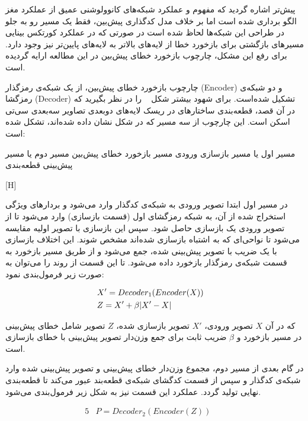 پیش‌تر اشاره گردید که مفهوم و عملکرد شبکه‌های کانوولوشنی عمیق از عملکرد مغز الگو برداری شده است اما بر خلاف مدل‌ کدگذاری پیش‌بین، فقط یک مسیر رو به جلو در طراحی این شبکه‌ها لحاظ شده است در صورتی که در عملکرد کورتکس بینایی مسیرهای بازگشتی برای بازخورد خطا از لایه‌های بالاتر به لایه‌های پایین‌تر نیز وجود دارد. برای رفع این مشکل، چارچوب بازخورد خطای پیش‌بین در این مطالعه ارایه گردیده است.


چارچوب بازخورد خطای پیش‌بین، از یک شبکه‌ی رمزگذار (Encoder) و دو شبکه‌ی رمزگشا (Decoder) تشکیل شده‌است. برای شهود بیشتر شکل ~ را در نظر بگیرید که در آن قصد، قطعه‌بندی ساختارهای در ریسک لایه‌های دوبعدی تصاویر سه‌بعدی سی‌تی اسکن است. این چارچوب از سه مسیر که در شکل نشان داده شده‌اند، تشکل شده است:

 مسیر اول یا مسیر بازسازی ورودی
 مسیر بازخورد خطای پیش‌بین
 مسیر دوم یا مسیر پیش‌بینی قطعه‌بندی

[H]

در مسیر اول ابتدا تصویر ورودی به شبکه‌ی کدگذار وارد می‌شود و بردارهای ویژگی استخراج شده از آن، به شبکه رمزگشای اول (قسمت بازسازی) وارد می‌شود تا از تصویر ورودی یک بازسازی حاصل شود. سپس این بازسازی با تصویر اولیه مقایسه‌ می‌شود تا نواحی‌ای که به اشتباه بازسازی شده‌اند مشخص شوند. این اختلاف بازسازی با یک ضریب با تصویر پیش‌بینی شده، جمع می‌شود و از طریق مسیر بازخورد به قسمت شبکه‌ی رمزگذار بازخورد داده می‌شود. تا این قسمت از روند را می‌توان به صورت زیر فرمول‌بندی نمود:

\begin{alignat}{5}
	&X' = Decoder_1(Encoder(X))    \label{recpep} && \\
	&Z = X' + \beta|X'-X| && \notag
\end{alignat}

که در آن $X$ تصویر ورودی، $X'$ تصویر بازسازی شده، $Z$ تصویر شامل‌ خطای پیش‌بینی در مسیر بازخورد و $\beta$ ضریب ثابت برای جمع وزن‌دار تصویر پیش‌بینی با خطای بازسازی است.

در گام بعدی از مسیر دوم، مجموع وزن‌دار خطای پیش‌بینی و تصویر پیش‌بینی شده وارد شبکه‌ی کدگذار و سپس از قسمت کدگشای شبکه‌ی قطعه‌بند عبور می‌کند تا قطعه‌بندی نهایی تولید گردد. عملکرد این قسمت نیز به شکل زیر فرمول‌بندی می‌شود.

\begin{alignat}{5}
	&P = Decoder_2(Encoder(Z))    \label{segpep} &&
\end{alignat}

